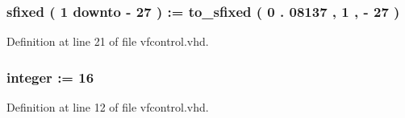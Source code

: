 \subsubsection[{m\+M\+I\+N}]{ {\bfseries \textcolor{vhdlchar}{ }} {\bfseries \textcolor{comment}{sfixed}\textcolor{vhdlchar}{ }\textcolor{vhdlchar}{(}\textcolor{vhdlchar}{ }\textcolor{vhdlchar}{ } \textcolor{vhdldigit}{1} \textcolor{vhdlchar}{ }\textcolor{keywordflow}{downto}\textcolor{vhdlchar}{ }\textcolor{vhdlchar}{-\/}\textcolor{vhdlchar}{ } \textcolor{vhdldigit}{27} \textcolor{vhdlchar}{ }\textcolor{vhdlchar}{)}\textcolor{vhdlchar}{ }\textcolor{vhdlchar}{ }\textcolor{vhdlchar}{ }\textcolor{vhdlchar}{\+:}\textcolor{vhdlchar}{=}\textcolor{vhdlchar}{ }\textcolor{vhdlchar}{ }\textcolor{vhdlchar}{ }\textcolor{vhdlchar}{ }\textcolor{vhdlchar}{to\+\_\+sfixed}\textcolor{vhdlchar}{ }\textcolor{vhdlchar}{(}\textcolor{vhdlchar}{ }\textcolor{vhdlchar}{ } \textcolor{vhdldigit}{0} \textcolor{vhdlchar}{.} \textcolor{vhdldigit}{08137} \textcolor{vhdlchar}{ }\textcolor{vhdlchar}{,}\textcolor{vhdlchar}{ }\textcolor{vhdlchar}{ } \textcolor{vhdldigit}{1} \textcolor{vhdlchar}{ }\textcolor{vhdlchar}{,}\textcolor{vhdlchar}{ }\textcolor{vhdlchar}{-\/}\textcolor{vhdlchar}{ } \textcolor{vhdldigit}{27} \textcolor{vhdlchar}{ }\textcolor{vhdlchar}{)}\textcolor{vhdlchar}{ }} \hspace{0.3cm}{\ttfamily [Generic]}}\label{classvfcontrol_a9912dbac80dc6644996e1665646e0823}


Definition at line 21 of file vfcontrol.\+vhd.

\hypertarget{classvfcontrol_afee4aa1628956aa350183d8881689198}{}
\subsubsection[{n\+\_\+bits\+\_\+c}]{ {\bfseries \textcolor{vhdlchar}{ }} {\bfseries \textcolor{comment}{integer}\textcolor{vhdlchar}{ }\textcolor{vhdlchar}{ }\textcolor{vhdlchar}{\+:}\textcolor{vhdlchar}{=}\textcolor{vhdlchar}{ }\textcolor{vhdlchar}{ } \textcolor{vhdldigit}{16} \textcolor{vhdlchar}{ }} \hspace{0.3cm}{\ttfamily [Generic]}}\label{classvfcontrol_afee4aa1628956aa350183d8881689198}


Definition at line 12 of file vfcontrol.\+vhd.

